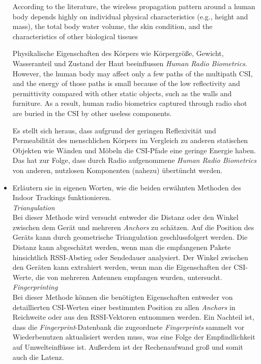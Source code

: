 \begin{itemize}
    \glqq According to the literature, the wireless 
    propagation pattern around a human body depends
    highly on individual physical characteristics
    (e.g., height and mass), the total body water 
    volume, the skin condition, and the characteristics 
    of other biological tissues\grqq

    Physikalische Eigenschaften des Körpers wie 
    Körpergröße, Gewicht, Wasseranteil und Zustand 
    der Haut beeinflussen \textit{Human Radio 
    Biometrics}.\\[1mm]

    \glqq However, the human body may affect only a 
    few paths of the multipath CSI, and the energy 
    of those paths is small because of the low 
    reflectivity and permittivity compared with 
    other static objects, such as the walls and 
    furniture. As a result, human radio biometrics
    captured through radio shot are buried in the 
    CSI by other useless components.\grqq
    
    Es stellt sich heraus, dass aufgrund der geringen
    Reflexivität und Permeabilität des menschlichen 
    Körpers im Vergleich zu anderen statischen Objekten 
    wie Wänden und Möbeln die CSI-Pfade eine geringe 
    Energie haben. Das hat zur Folge, dass durch Radio 
    aufgenommene \textit{Human Radio Biometrics} von anderen, 
    nutzlosen Komponenten (nahezu) übertüncht werden.

    \item Erläutern sie in eigenen Worten, wie die beiden 
    erwähnten Methoden des Indoor Trackings
    funktionieren.\\[1mm]


    \textit{Triangulation}\\
    Bei dieser Methode wird versucht entweder die Distanz 
    oder den Winkel zwischen dem Gerät und mehreren 
    \textit{Anchors} zu schätzen. Auf die  Position des 
    Geräts kann durch geometrische Triangulation 
    geschlussfolgert werden. Die Distanz kann abgeschätzt 
    werden, wenn man die empfangenen Pakete hinsichtlich
    RSSI-Abstieg oder Sendedauer analysiert. Der Winkel 
    zwischen den Geräten kann extrahiert werden, wenn man 
    die Eigenschaften der CSI-Werte, die von mehreren 
    Antennen empfangen wurden, untersucht.\\[1mm]
    
    \textit{Fingerprinting}\\

    Bei dieser Methode können die benötigten Eigenschaften
    entweder von detaillierten CSI-Werten einer bestimmten 
    Position zu allen \textit{Anchors} in Reichweite oder
    aus den RSSI-Vektoren entnommen werden.
    Ein Nachteil ist, dass die \textit{Fingerprint}-Datenbank
    die zugeordnete \textit{Fingerprints} sammelt vor 
    Wiederbenutzen aktualisiert werden muss, was eine Folge
    der Empfindlichkeit auf Umwelteinflüsse ist.
    Außerdem ist der Rechenaufwand groß und somit auch die 
    Latenz.
    \end{itemize}



